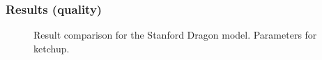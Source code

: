 \documentclass{beamer}
\begin{document}
\begin{frame}
    \frametitle{Results (quality)}
				\begin{figure}
\centering
{}
\vspace{-0.2cm}
\caption{Result comparison for the Stanford Dragon model. Parameters for ketchup.}
\end{figure}
\end{frame}
\end{document}

